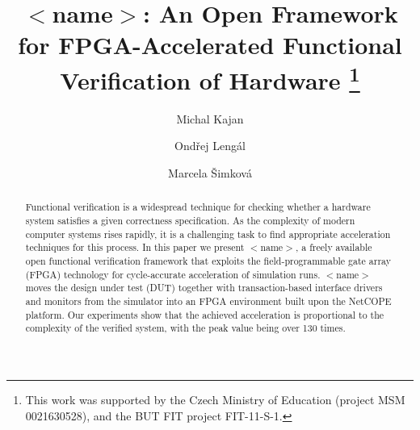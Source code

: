 \documentclass[draft]{llncs}
\title{$<$name$>$: An Open Framework for FPGA-Accelerated Functional Verification 
of Hardware
\thanks{This work was supported by the Czech Ministry of Education (project
MSM 0021630528), and the BUT FIT project FIT-11-S-1.}\vspace*{-0mm}}
\author{Michal Kajan%
\and  Ond\v{r}ej Leng\'{a}l%
\and  Marcela \v{S}imkov\'{a}%
}
\institute{ {FIT, Brno University of Technology, Czech Republic}
}
\begin{document}
 

\maketitle

\vspace*{-0mm}\begin{abstract}Functional verification is a widespread technique 
for checking whether a hardware system satisfies a given correctness specification. 
As the complexity of modern computer systems rises rapidly, it is a challenging 
task to find appropriate acceleration techniques for this process.
In this paper we present $<$name$>$, a freely available open functional
verification framework that exploits the field-programmable gate array (FPGA)
technology for cycle-accurate acceleration of simulation runs.
$<$name$>$ moves the design under test (DUT) together with transaction-based
interface drivers and monitors from the simulator into an FPGA environment built
upon the NetCOPE platform.
Our experiments show that the achieved acceleration is proportional to the
complexity of the verified system, with the peak value being over 130 times.
\end{abstract}
\end{document}
